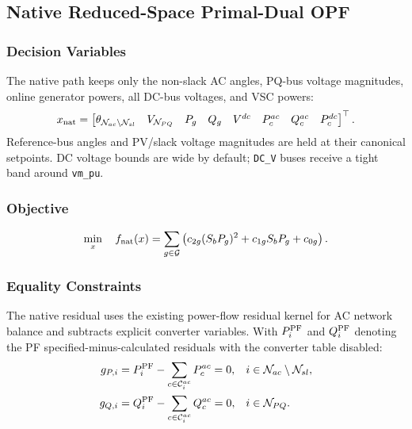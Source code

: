 \subsection{Native Reduced-Space Primal-Dual OPF}

\subsubsection{Decision Variables}

The native path keeps only the non-slack AC angles, PQ-bus voltage magnitudes,
online generator powers, all DC-bus voltages, and VSC powers:
\begin{align}
x_{\mathrm{nat}}=
\begin{bmatrix}
\theta_{\mathcal{N}_{ac}\setminus\mathcal{N}_{sl}}&
V_{\mathcal{N}_{PQ}}&
P_g&Q_g&
V^{dc}&
P_c^{ac}&Q_c^{ac}&P_c^{dc}
\end{bmatrix}^{\top}.
\end{align}
Reference-bus angles and PV/slack voltage magnitudes are held at their canonical
setpoints.  DC voltage bounds are wide by default; \texttt{DC\_V} buses receive
a tight band around \texttt{vm\_pu}.

\subsubsection{Objective}

\begin{align}
\min_x\quad
f_{\mathrm{nat}}(x)=
\sum_{g\in\mathcal{G}}
\left(c_{2g}(S_bP_g)^2+c_{1g}S_bP_g+c_{0g}\right).
\end{align}

\subsubsection{Equality Constraints}

The native residual uses the existing power-flow residual kernel for AC network
balance and subtracts explicit converter variables.  With \(P_i^{\mathrm{PF}}\)
and \(Q_i^{\mathrm{PF}}\) denoting the PF specified-minus-calculated residuals
with the converter table disabled:
\begin{align}
g_{P,i} &=
P_i^{\mathrm{PF}}-\sum_{c\in\mathcal{C}^{ac}_i}P_c^{ac}=0,
&& i\in\mathcal{N}_{ac}\setminus\mathcal{N}_{sl},\\
g_{Q,i} &=
Q_i^{\mathrm{PF}}-\sum_{c\in\mathcal{C}^{ac}_i}Q_c^{ac}=0,
&& i\in\mathcal{N}_{PQ}.
\end{align}

